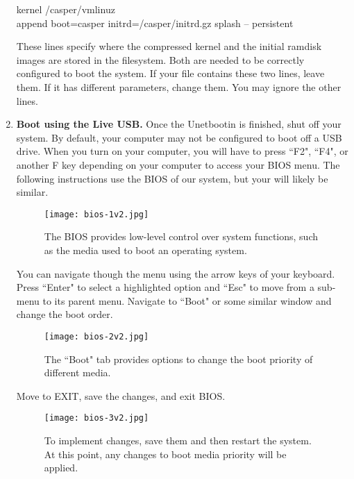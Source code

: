 \begin{enumerate}
\begin{example}
kernel /casper/vmlinuz \\
append boot=casper initrd=/casper/initrd.gz splash -- persistent \\
\end{example}

These lines specify where the compressed kernel and the initial ramdisk images are stored in the filesystem. Both are needed to be correctly configured to boot the system. If your file contains these two lines, leave them. If it has different parameters, change them. You may ignore the other lines. 

\item \textbf{Boot using the Live USB.} Once the Unetbootin is finished, shut off your system. By default, your computer may not be configured to boot off a USB drive. When you turn on your computer, you will have to press ``F2", ``F4", or another F key depending on your computer to access your BIOS menu. The following instructions use the BIOS of our system, but your will likely be similar. 

\begin{figure}[h]
\begin{center}
\texttt{[image: bios-1v2.jpg]}
\caption[BIOS page]{The BIOS provides low-level control over system functions, such as the media used to boot an operating system.}
\end{center}
\end{figure}

You can navigate though the menu using the arrow keys of your keyboard. Press ``Enter" to select a highlighted option and ``Esc" to move from a sub-menu to its parent menu. Navigate to ``Boot" or some similar window and change the boot order. 

\begin{figure}[h]
\begin{center}
\texttt{[image: bios-2v2.jpg]}
\caption[BIOS boot order]{The ``Boot" tab provides options to change the boot priority of different media.}
\end{center}
\end{figure}

Move to EXIT, save the changes, and exit BIOS. 

\begin{figure}[h]
\begin{center}
\texttt{[image: bios-3v2.jpg]}
\caption[BIOS exit]{To implement changes, save them and then restart the system. At this point, any changes to boot media priority will be applied.}
\end{center}
\end{figure}


\end{enumerate}
